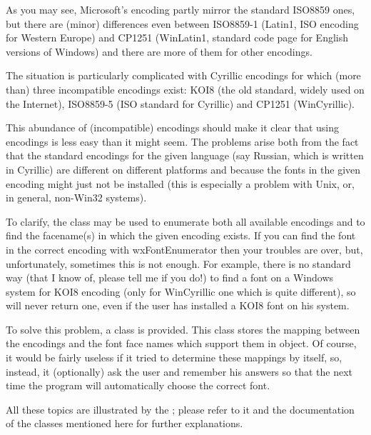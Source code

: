 As you may see, Microsoft's encoding partly mirror the standard ISO8859 ones,
but there are (minor) differences even between ISO8859-1 (Latin1, ISO encoding
for Western Europe) and CP1251 (WinLatin1, standard code page for English
versions of Windows) and there are more of them for other encodings.

The situation is particularly complicated with Cyrillic encodings for which
(more than) three incompatible encodings exist: KOI8 (the old standard, widely
used on the Internet), ISO8859-5 (ISO standard for Cyrillic) and CP1251
(WinCyrillic).

This abundance of (incompatible) encodings should make it clear that using
encodings is less easy than it might seem. The problems arise both from the
fact that the standard encodings for the given language (say Russian, which is
written in Cyrillic) are different on different platforms and because the
fonts in the given encoding might just not be installed (this is especially a
problem with Unix, or, in general, non-Win32 systems).

To clarify, the  
class may be used to enumerate both all available encodings and to find the
facename(s) in which the given encoding exists. If you can find the font in
the correct encoding with wxFontEnumerator then your troubles are over, but,
unfortunately, sometimes this is not enough. For example, there is no standard
way (that I know of, please tell me if you do!) to find a font on a Windows system
for KOI8 encoding (only for WinCyrillic one which is quite different), so 
 will never return one, even if
the user has installed a KOI8 font on his system.

To solve this problem, a  class is provided.
This class stores the mapping between the encodings and the font face
names which support them in  object. Of
course, it would be fairly useless if it tried to determine these mappings by
itself, so, instead, it (optionally) ask the user and remember his answers
so that the next time the program will automatically choose the correct font.

All these topics are illustrated by the ;
please refer to it and the documentation of the classes mentioned here for
further explanations.

